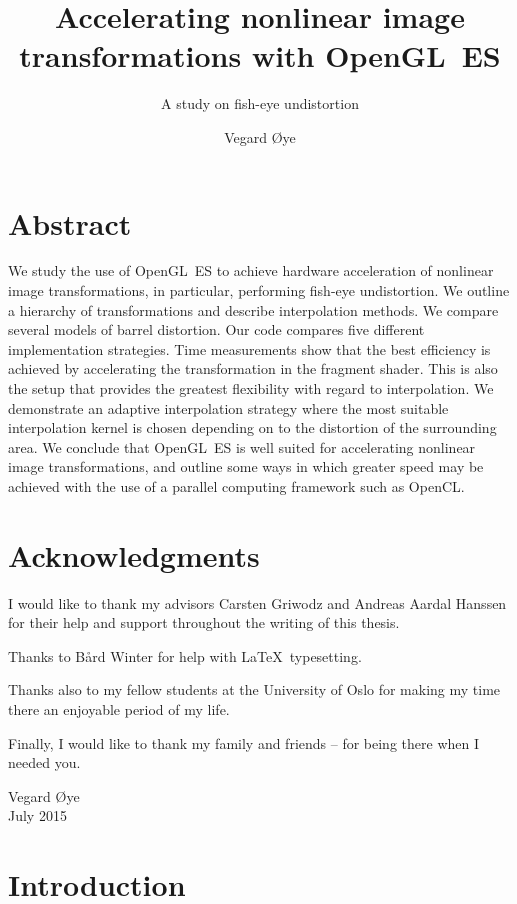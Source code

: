 \documentclass[english,12pt]{ifimaster}
\title{Accelerating nonlinear image transformations with OpenGL~ES}
\subtitle{A study on fish-eye undistortion}
\author{Vegard Øye}
\begin{document}
\ififorside{}
\frontmatter{}
\maketitle{}

\chapter*{Abstract}

We study the use of OpenGL~ES to achieve hardware acceleration of
nonlinear image transformations, in particular, performing fish-eye
undistortion. We outline a hierarchy of transformations and describe
interpolation methods. We compare several models of barrel distortion.
Our code compares five different implementation strategies. Time
measurements show that the best efficiency is achieved by accelerating
the transformation in the fragment shader. This is also the setup that
provides the greatest flexibility with regard to interpolation. We
demonstrate an adaptive interpolation strategy where the most suitable
interpolation kernel is chosen depending on to the distortion of the
surrounding area. We conclude that OpenGL~ES is well suited for
accelerating nonlinear image transformations, and outline some ways in
which greater speed may be achieved with the use of a parallel
computing framework such as OpenCL.

\tableofcontents

\chapter*{Acknowledgments}

I would like to thank my advisors Carsten Griwodz and Andreas Aardal
Hanssen for their help and support throughout the writing of this
thesis.

Thanks to Bård Winter for help with \LaTeX\ typesetting.

Thanks also to my fellow students at the University of Oslo for making
my time there an enjoyable period of my life.

Finally, I would like to thank my family and friends -- for being
there when I needed you.

\begin{flushright}
  Vegard Øye\\
  July 2015
\end{flushright}

\mainmatter{}

\chapter{Introduction}
\label{chap:introduction}
\end{document}
